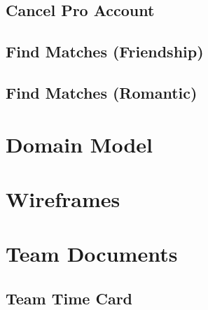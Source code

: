 \documentclass[10pt, draft]{article}
\begin{document}
\subsection{Cancel Pro Account}
\subsection{Find Matches (Friendship)}
\subsection{Find Matches (Romantic)}

\section{Domain Model}

\section{Wireframes}

\section{Team Documents}
\subsection{Team Time Card}
\end{document}
